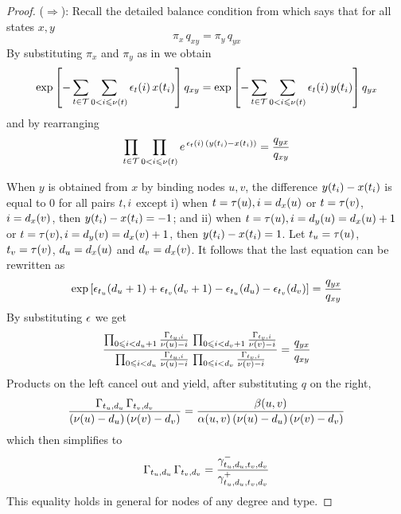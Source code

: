 \begin{proof}
  ($\Rightarrow$):
  Recall the detailed balance condition
  from 
  which says that for all states $x,y$
  \[ \pi_x \, q_{xy} = \pi_y \, q_{yx} \]
  By substituting $\pi_x$ and $\pi_y$ as in  we obtain
  \begin{equation*}
    \operatorname*{exp}\left[
      -\sum_{t \in \mathcal{T}} \sum_{0 < i \leqslant \nu(t)}
      \epsilon_t(i) \, x(t_i)
    \right] q_{xy} =
    \operatorname*{exp}\left[
      -\sum_{t \in \mathcal{T}} \sum_{0 < i \leqslant \nu(t)}
      \epsilon_t(i) \, y(t_i)
    \right] q_{yx}
  \end{equation*}
  and by rearranging
  \[ \prod_{t \in \mathcal{T}} \prod_{0 < i \leqslant \nu(t)}
     e^{\,\epsilon_t(i) \, (y(t_i) - x(t_i))} =
     \frac{q_{yx}}{q_{xy}} \]

  When $y$ is obtained from $x$ by binding nodes $u,v$,
  the difference $y(t_i) - x(t_i)$ is equal to $0$
  for all pairs $t, i$ except
  i) when $t = \tau(u), i = d_x(u)$
  or $t = \tau(v)$, $i = d_x(v)$,
  then $y(t_i) - x(t_i) = -1$; and
  ii) when $t = \tau(u), i = d_y(u) = d_x(u) + 1$
  or $t = \tau(v), i = d_y(v) = d_x(v) + 1$,
  then $y(t_i) - x(t_i) = 1$.
  Let $t_u = \tau(u)$, $t_v = \tau(v)$,
  $d_u = d_x(u)$ and $d_v = d_x(v)$.
  It follows that the last equation can be rewritten as
  \[ \operatorname*{exp}\left[
       \epsilon_{t_u}(d_u+1) +
       \epsilon_{t_v}(d_v+1) -
       \epsilon_{t_u}(d_u) -
       \epsilon_{t_v}(d_v) \right] =
     \frac{q_{yx}}{q_{xy}} \]
  By substituting $\epsilon$ we get %
  \[ \frac{
     \prod_{0 \leqslant i < d_u+1}%
     \frac{\Gamma_{\tp_u,i}}{\valence(u) - i} \,
     \prod_{0 \leqslant i < d_v+1}%
     \frac{\Gamma_{\tp_v,i}}{\valence(v) - i}}{
     \prod_{0 \leqslant i < d_u}%
     \frac{\Gamma_{\tp_u,i}}{\valence(u) - i} \,
     \prod_{0 \leqslant i < d_v}%
     \frac{\Gamma_{\tp_v,i}}{\valence(v) - i}} =
     \frac{q_{yx}}{q_{xy}} \]
  Products on the left cancel out and yield,
  after substituting $q$ on the right,
  \[ \frac{
       \Gamma_{t_u,d_u} \, \Gamma_{t_v,d_v}}{
       (\nu(u) - d_u) \, (\nu(v) - d_v)} =
     \frac{
       \beta(u,v)}{
       \alpha(u,v) \, (\nu(u) - d_u) \, (\nu(v) - d_v)} \]
  which then simplifies to
  \[ \Gamma_{t_u,d_u} \, \Gamma_{t_v,d_v} =
    \frac{\gamma^-_{t_u,d_u,t_v,d_v}}{\gamma^+_{t_u,d_u,t_v,d_v}} \]
  This equality holds in general for nodes of any degree and type.


\end{proof}
